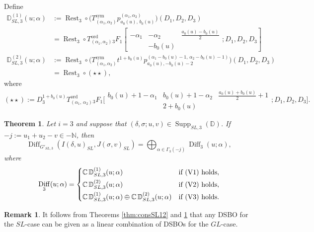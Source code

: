 \documentclass[a4paper,11pt,reqno]{amsart}
\newcommand{\DD}{\mathbb{D}}
\newcommand{\0}{{\bf 0}}
\newcommand{\N}{\mathbb{N}}
\newcommand{\C}{\mathbb{C}}
\newcommand{\1}{{\bf 1}}
\newcommand{\ord}{{\mathrm{ord}}}
\DeclareMathOperator{\Supp}{Supp}
\DeclareMathOperator{\Diff}{Diff}
\DeclareMathOperator{\Rest}{Rest}
\theoremstyle{plain}
\newtheorem{theorem}[equation]{Theorem}
\theoremstyle{definition}
\newtheorem{remark}[equation]{Remark}
\numberwithin{equation}{section}
\theoremstyle{definition}
\begin{document}
Define
\vspace{5pt}
\begin{align*}
\DD^{(1)}_{SL,3}(u;\alpha)
&:=\Rest_3\circ
\big(T^{\mathrm{sym}}_{(\alpha_1,\alpha_2)} 
p^{(\alpha_1,\alpha_2)}_{a_0(u), \,b_0(u)}\big)
(D_1, D_2, D_3)\\[5pt]
&=\Rest_3\circ 
T^\ord_{(\alpha_1,\alpha_2)}{}_3F_1
\left[ \begin{matrix}
    -\alpha_1& -\alpha_2 & \tfrac{a_0(u)-b_0(u)}{2}\\
     &-b_0(u)&  
\end{matrix}; D_1, D_2, D_3\right]\\[10pt]
\DD^{(2)}_{SL,3}(u;\alpha)
&:=\Rest_3\circ \big(T^{\mathrm{sym}}_{(\alpha_1,\alpha_2)} 
t^{1+b_0(u)}p^{(\alpha_1-b_0(u)-1, \,\alpha_2-b_0(u)-1)}_{a_0(u),-b_0(u)-2}\big)(D_1, D_2, D_3) \\[5pt]
&=\Rest_3\circ (\star\star),
\end{align*}
where
\begin{equation*}
(\star\star):=
D_3^{1+b_0(u)}
T^\ord_{(\alpha_1,\,\alpha_2)}{}_3F_1\Big [\begin{matrix}
    b_0(u)+1-\alpha_1 & b_0(u)+1-\alpha_2 & \tfrac{a_0(u)+b_0(u)}{2}+1\\
    & 2+b_0(u)& 
\end{matrix}; D_1, D_2, D_3\Big ].
\end{equation*}

\begin{theorem}\label{thm:consSL3}
Let $i=3$ and suppose that $(\delta,\sigma; u, v) \in \Supp_{SL,3}(\DD)$.
If $-j:=u_1+u_2-v\in -\N$, then
\begin{equation*}
\Diff_{G'_{SL,3}}(I(\delta,u)_{SL}, J(\sigma,v)_{SL})
=\bigoplus_{\alpha\in\Gamma_3(-j)}
\Diff_3(u;\alpha),
\end{equation*}
where
\begin{equation*}
\Diff_3(u;\alpha)
=
\begin{cases}
\C\, \DD^{(1)}_{SL,3}(u;\alpha) & \textnormal{if (V1) holds},\\[3pt]
\C\, \DD^{(2)}_{SL,3}(u;\alpha) & \textnormal{if (V2) holds},\\[3pt]
\C\, \DD^{(1)}_{SL,3}(u;\alpha) \oplus 
\C\, \DD^{(2)}_{SL,3}(u;\alpha)
& \textnormal{if (V3) holds}.
\end{cases}
\end{equation*}
\end{theorem}

\begin{remark}
It follows from Theorems \ref{thm:consSL12} and \ref{thm:consSL3} that 
any DSBO for the $SL$-case can be given as a linear combination of
DSBOs for the $GL$-case.
\end{remark}
\end{document}
